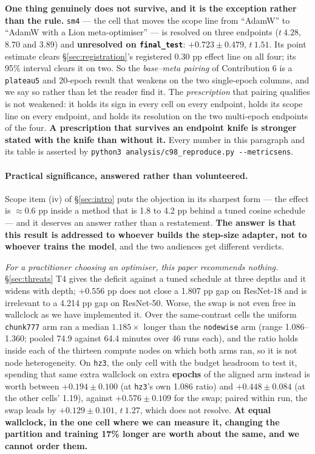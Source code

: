 \documentclass[10pt,letterpaper]{article}
\newcommand{\plateau}{\texttt{plateau5}}
\newcommand{\arm}[1]{\texttt{#1}}
\begin{document}
\textbf{One thing genuinely does not survive, and it is the exception rather than the rule.}
\arm{sm4} --- the cell that moves the scope line from ``AdamW'' to ``AdamW with a Lion
meta-optimiser'' --- is resolved on three endpoints ($t\ 4.28$, $8.70$ and $3.89$) and
\textbf{unresolved on \texttt{final\_test}}: $+0.723 \pm 0.479$, $t\ 1.51$. Its point estimate
clears \S\ref{sec:registration}'s registered 0.30 pp effect line on all four; its 95\% interval
clears it on two. So the \emph{base--meta pairing} of Contribution 6 is a \plateau{} and
20-epoch result that weakens on the two single-epoch columns, and we say so rather than let the
reader find it. The \emph{prescription} that pairing qualifies is not weakened: it holds its
sign in every cell on every endpoint, holds its scope line on every endpoint, and holds its
resolution on the two multi-epoch endpoints of the four. \textbf{A prescription that survives an
endpoint knife is stronger stated with the knife than without it.} Every number in this
paragraph and its table is asserted by
\texttt{python3 analysis/c98\_reproduce.py -{}-metricsens}.

\paragraph{Practical significance, answered rather than volunteered.}
Scope item (iv) of \S\ref{sec:intro} puts the objection in its sharpest form --- the effect is
$\approx 0.6$ pp inside a method that is 1.8 to 4.2 pp behind a tuned cosine schedule --- and it
deserves an answer rather than a restatement. \textbf{The answer is that this result is addressed
to whoever builds the step-size adapter, not to whoever trains the model}, and the two audiences
get different verdicts.

\emph{For a practitioner choosing an optimiser, this paper recommends nothing.}
\S\ref{sec:threats} T4 gives the deficit against a tuned schedule at three depths and it widens
with depth; $+0.556$ pp does not close a 1.807 pp gap on ResNet-18 and is irrelevant to a
4.214 pp gap on ResNet-50. Worse, the swap is not even free in wallclock as we have implemented
it. Over the same-contrast cells the uniform \arm{chunk777} arm ran a median $\mathbf{1.185\times}$
longer than the \arm{nodewise} arm (range 1.086--1.360; pooled 74.9 against 64.4 minutes over 46
runs each), and the ratio holds inside each of the thirteen compute nodes on which both arms ran,
so it is not node heterogeneity. On \arm{hz3}, the only cell with the budget headroom to test it,
spending that same extra wallclock on extra \textbf{epochs} of the aligned arm instead is worth
between $+0.194 \pm 0.100$ (at \arm{hz3}'s own 1.086 ratio) and $+0.448 \pm 0.084$ (at the other
cells' 1.19), against $+0.576 \pm 0.109$ for the swap; paired within run, the swap leads by
$+0.129 \pm 0.101$, $t\ 1.27$, which does not resolve. \textbf{At equal wallclock, in the one cell
where we can measure it, changing the partition and training 17\% longer are worth about the same,
and we cannot order them.}
\end{document}

